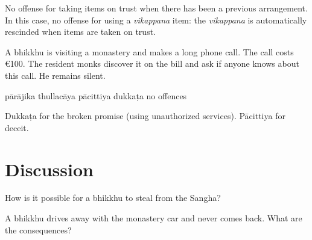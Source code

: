 \begin{exam}{\autoExamName}
\begin{problem*}
\begin{parts}
  \begin{solution}
    No offense for taking items on trust when there has been a previous
    arrangement. In this case, no offense for using a \textit{vikappana} item:
    the \emph{vikappana} is automatically rescinded when items are taken on
    trust.
  \end{solution}

  \item A bhikkhu is visiting a monastery and makes a long phone call. The call
  costs €100. The resident monks discover it on the bill and ask if
  anyone knows about this call. He remains silent.

  \bigskip

  \begin{answers}{5}
    \bChoices
     pārājika\eAns
     thullacāya\eAns
     pācittiya\eAns
     dukkaṭa\eAns
     no offences\eAns
    \eChoices
  \end{answers}

  \begin{solution}
    Dukkaṭa for the broken promise (using unauthorized services). Pācittiya for deceit.
  \end{solution}

\end{parts}

\end{problem*}

\end{exam}

\section*{Discussion}

How is it possible for a bhikkhu to steal from the Sangha?

\bigskip

A bhikkhu drives away with the monastery car and never comes back.
What are the consequences?

